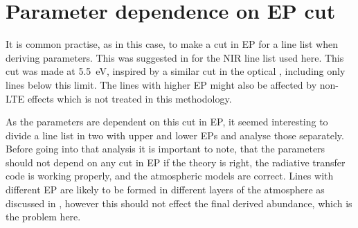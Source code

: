 \section{Parameter dependence on EP cut}
\label{sec:EPcut}

It is common practise, as in this case, to make a cut in EP for a line list when deriving
parameters. This was suggested in \citet{Andreasen2016} \citep[later done in][]{Andreasen2017b} for
the NIR line list used here. This cut was made at \SI{5.5}{eV}, inspired by a similar cut in the
optical \citep{Sousa2008a}, including only lines below this limit. The lines with higher EP might
also be affected by non-LTE effects which is not treated in this methodology.

As the parameters are dependent on this cut in EP, it
seemed interesting to divide a line list in two with upper and lower EPs and analyse those
separately. Before going into that analysis it is important to note, that the parameters should not
depend on any cut in EP if the theory is right, the radiative transfer code is working properly, and
the atmospheric models are correct. Lines with different EP are likely to be formed in different
layers of the atmosphere as discussed in , however this should not
effect the final derived abundance, which is the problem here.
